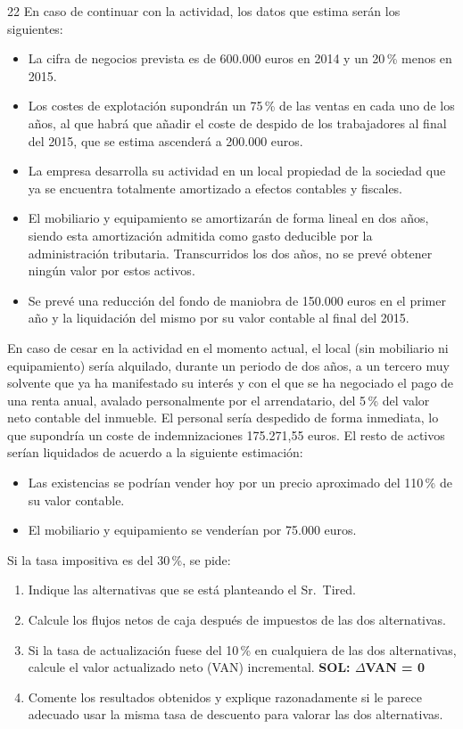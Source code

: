 \documentclass[10pt,a4paper,twoside]{article}
\newcommand{\eur}{\,\text{€}\xspace}
\begin{document}
\begin{enunciado}{22}
En caso de continuar con la actividad, los datos que estima serán los siguientes:
\begin{itemize}
  \item La cifra de negocios prevista es de 600.000 euros en 2014 y un 20\,\% menos en 2015.
  \item Los costes de explotación supondrán un 75\,\% de las ventas en cada uno de los años, al que habrá que añadir el
        coste de despido de los trabajadores al final del 2015, que se estima ascenderá a 200.000 euros.
  \item La empresa desarrolla su actividad en un local propiedad de la sociedad que ya se encuentra totalmente
        amortizado a efectos contables y fiscales.
  \item El mobiliario y equipamiento se amortizarán de forma lineal en dos años, siendo esta amortización admitida como
        gasto deducible por la administración tributaria. Transcurridos los dos años, no se prevé obtener ningún valor
        por estos activos.
  \item Se prevé una reducción del fondo de maniobra de 150.000 euros en el primer año y la liquidación del mismo por
        su valor contable al final del 2015.
\end{itemize}
En caso de cesar en la actividad en el momento actual, el local (sin mobiliario ni equipamiento) sería alquilado,
durante un periodo de dos años, a un tercero muy solvente que ya ha manifestado su interés y con el que se ha negociado
el pago de una renta anual, avalado personalmente por el arrendatario, del 5\,\% del valor neto contable del inmueble.
El personal sería despedido de forma inmediata, lo que supondría un coste de indemnizaciones 175.271,55 euros. El resto
de activos serían liquidados de acuerdo a la siguiente estimación:
\begin{itemize}
  \item Las existencias se podrían vender hoy por un precio aproximado del 110\,\% de su valor contable.
  \item El mobiliario y equipamiento se venderían por 75.000 euros.
\end{itemize}
Si la tasa impositiva es del 30\,\%, se pide:
\begin{enumerate}
  \item Indique las alternativas que se está planteando el Sr.~Tired.
  \item Calcule los flujos netos de caja después de impuestos de las dos alternativas.
  \item Si la tasa de actualización fuese del 10\,\% en cualquiera de las dos alternativas, calcule el valor
        actualizado neto (VAN) incremental. \textbf{SOL: $\Delta$VAN = 0\eur}
  \item Comente los resultados obtenidos y explique razonadamente si le parece adecuado usar la misma tasa de descuento
        para valorar las dos alternativas.
\end{enumerate}
\end{enunciado}
\end{document}
